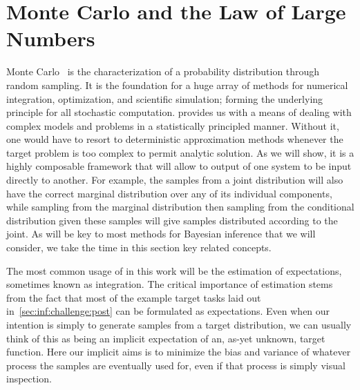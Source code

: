 
\section{Monte Carlo and the Law of Large Numbers}
\label{sec:inf:mc}

Monte Carlo~\citep{metropolis1949monte} is the characterization of a probability distribution 
through random sampling. It is the foundation for a huge array of methods for numerical 
integration, optimization, and scientific simulation; forming the underlying principle 
for all stochastic computation.
\mc provides us with a means of dealing with complex models and problems in a
statistically principled manner.  Without it, one would have to resort to deterministic
approximation methods whenever the target problem is too complex to permit analytic
solution.  As we will show, it is a highly composable framework that will allow to output
of one system to be input directly to another.  For example, the \mc samples from a joint
distribution will also have the correct marginal distribution over any of its individual components,
while sampling from the marginal distribution then sampling from the conditional distribution
given these samples will give samples distributed according to the joint.  As \mc
will be key to most methods for Bayesian inference that we will consider, we take the time
in this section key related concepts.

The most common usage of \mc in this work will be the \mc estimation of expectations, 
sometimes known as \mc integration.  
The critical importance of \mc estimation stems from the fact that most of the example
target tasks laid out in~\ref{sec:inf:challenge:post} can be formulated as expectations.
Even when our intention is simply to generate samples from a target distribution, we can
usually think of this as being an implicit expectation of an, as-yet unknown, target function.
Here our implicit aims is to minimize the bias and variance of whatever process the samples are eventually
used for, even if that process is simply visual inspection.  

